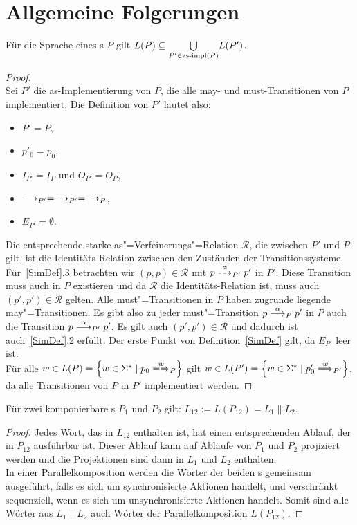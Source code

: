 \section{Allgemeine Folgerungen}
\label{saetzeKapitel}

\begin{Prop}
  \label{LImpProp}
  Für die Sprache eines \MEIO{}s $P$ gilt $L(P) \subseteq \underset{P'\in\mathrm{as}\text{-}\mathrm{impl}
  (P)}{\bigcup} L(P')$.
\end{Prop}
\begin{proof}\mbox{}\\
  Sei $P'$ die as-Implementierung von $P$, die alle may- und must-Transitionen
  von $P$ implementiert. Die Definition von $P'$ lautet also:
  \begin{itemize}
    \item $P'=P$,
    \item $p'_0=p_0$,
    \item $I_{P'}=I_P$ und $O_{P'}=O_P$,
    \item $\must _{P'} =\may _{P'} = \may _P$,
    \item $E_{P'}=\emptyset$.
  \end{itemize}
  Die entsprechende starke as"=Verfeinerungs"=Relation $\mathcal{R}$, die
  zwischen $P'$ und $P$ gilt, ist die Identitäts-Relation zwischen den
  Zuständen der Transitionssysteme. Für~\ref{SimDef}.3 betrachten wir $(p,p)
  \in\mathcal{R}$ mit $p\may[\alpha]_{P'} p'$ in $P'$. Diese Transition muss
  auch in $P$ existieren und da $\mathcal{R}$ die Identitäts-Relation ist, muss
  auch $(p',p')\in\mathcal{R}$ gelten. Alle must"=Transitionen in $P$ haben
  zugrunde liegende may"=Transitionen. Es gibt also zu jeder must"=Transition
  $p \must[\alpha]_P p'$ in $P$ auch die Transition $p\must[\alpha]_{P'} p'$.
  Es gilt auch $(p',p') \in \mathcal{R}$ und dadurch ist auch~\ref{SimDef}.2
  erfüllt. Der erste Punkt von Definition~\ref{SimDef} gilt, da $E_{P'}$ leer
  ist.\\
  Für alle $w\in L(P) = \left\{w\in \Sigma ^* \mid p_0\weakmay[w]_P\right\}$
  gilt $w\in L(P') = \left\{w\in \Sigma ^* \mid p'_0 \weakmust[w]_{P'}
  \right\}$, da alle Transitionen von $P$ in $P'$ implementiert werden.
\end{proof}

\begin{Prop}
  \label{LParallelProp}
  Für zwei komponierbare \MEIO{}s $P_1$ und $P_2$ gilt: $L_{12} := L(P_{12}) =
  L_1\|L_2$.
\end{Prop}
\begin{proof}
  Jedes Wort, das in $L_{12}$ enthalten ist, hat einen entsprechenden Ablauf,
  der in $P_{12}$ ausführbar ist. Dieser Ablauf kann auf Abläufe von $P_1$ und
  $P_2$ projiziert werden und die Projektionen sind dann in $L_1$ und $L_2$
  enthalten.\\
  In einer Parallelkomposition werden die Wörter der beiden \MEIO{}s gemeinsam
  ausgeführt, falls es sich um synchronisierte Aktionen handelt, und
  verschränkt sequenziell, wenn es sich um unsynchronisierte Aktionen handelt.
  Somit sind alle Wörter aus $L_1\|L_2$ auch Wörter der Parallelkomposition
  $L(P_{12})$.
\end{proof}

